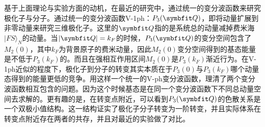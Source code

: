 基于上面理论与实验方面的动机，在最近的研究中，通过统一的变分波函数来研究极化子与分子\cite{Cui2020Fermi}。通过统一的变分波函数V-1ph：$P_3(\Vector{Q})$，即将动量扩展到非零动量来研究三维极化子。这里的$\Vector{Q}$指的是系统总的动量减掉费米海$|FS\rangle_N$的动量。当$|\Vector{Q}|=k_F$的时候，$P_3(\Vector{Q})$的变分空间包含了$M_2(0)$，其中$k_F$为背景原子的费米动量，因此$M_2(0)$变分空间得到的基态能量是不低于$P_3(k_F)$的。而且在强相互作用区间$M_2(0)$是$P_3(k_F)$渐近行为。在V-1ph近似的程度下，极化子到分子的转变其实本质在于$P_3(0)$与$P_3(k_F)$哪个动量态得到的能量更低的竞争。用这样一个统一的V-ph变分波函数，理清了两个变分波函数相互包含\cite{edwards2013smooth}的问题。因为这个时候基态是在同一个变分波函数下不同总动量空间去求解的。更有趣的是，在转变点附近，可以看到$P_3(\Vector{Q})$的色散关系是一个双极小值结构。这一结构证实了极化子分子转变为一阶转变，并且实际体系在转变点附近存在两者的共存，并且对最近的实验做了对比。

